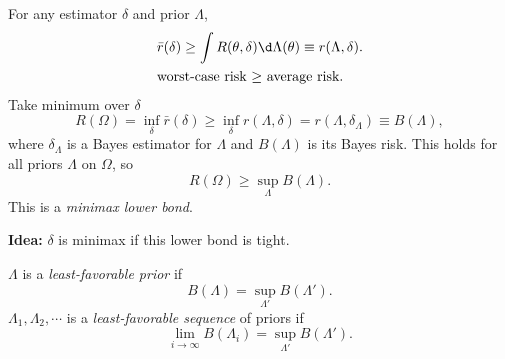 \documentclass[a4paper]{article}
\begin{document}
\begin{remark}
	For any estimator $\delta$ and prior $\Lambda$,
	\begin{equation}
		\begin{aligned}
			& \bar{r}(\delta) \geq \int R(\theta,\delta)\d \Lambda(\theta) \equiv r(\Lambda,\delta). \\
			& \text{worst-case risk $\geq$ average risk}.
		\end{aligned}
	\end{equation}
	Take minimum over $\delta$
	\begin{equation}
		R(\Omega) = \inf\limits_{\delta} \bar{r}(\delta) \geq \inf\limits_{\delta} r(\Lambda,\delta) = r(\Lambda,\delta_\Lambda) \equiv B(\Lambda),
	\end{equation}
	where $\delta_\Lambda$ is a Bayes estimator for $\Lambda$ and $B(\Lambda)$ is its Bayes risk. This holds for all priors $\Lambda$ on $\Omega$, so
	\begin{equation}
		R(\Omega) \geq \sup\limits_{\Lambda} B(\Lambda).
	\end{equation}
	This is a \emph{minimax lower bond}.
\end{remark}

\noindent \textbf{Idea:} $\delta$ is minimax if this lower bond is tight.

\begin{defi}
	$\Lambda$ is a \emph{least-favorable prior} if
	\begin{equation}
		B(\Lambda) = \sup\limits_{\Lambda'} B(\Lambda').
	\end{equation}
	$\Lambda_1,\Lambda_2,\cdots$ is a \emph{least-favorable sequence} of priors if
	\begin{equation}
		\lim\limits_{i \to \infty} B(\Lambda_i) = \sup\limits_{\Lambda'} B(\Lambda').
	\end{equation}
\end{defi}
\end{document}
